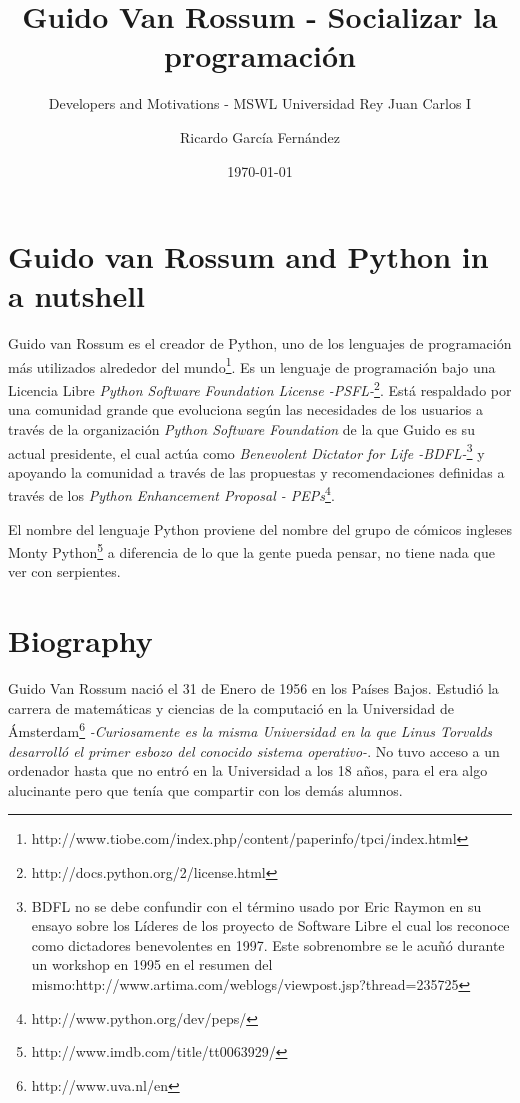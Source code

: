 \documentclass[11pt]{scrartcl}
\title{\textbf{Guido Van Rossum - Socializar la programación}}
\subtitle{Developers and Motivations - MSWL Universidad Rey Juan Carlos I}
\author{Ricardo García Fernández}
\date{\today}
\begin{document}
\maketitle

\newpage

\tableofcontents

\newpage

\section{Guido van Rossum and Python in a nutshell}

Guido van Rossum es el creador de Python, uno de los lenguajes de programación más utilizados alrededor del mundo\footnote{http://www.tiobe.com/index.php/content/paperinfo/tpci/index.html}. Es un lenguaje de programación bajo una Licencia Libre \emph{Python Software Foundation License -PSFL-}\footnote{http://docs.python.org/2/license.html}. Está respaldado por una comunidad grande que evoluciona según las necesidades de los usuarios a través de la organización \emph{Python Software Foundation} de la que Guido es su actual presidente, el cual actúa como \emph{Benevolent Dictator for Life -BDFL-}\footnote{BDFL no se debe confundir con el término usado por Eric Raymon en su ensayo sobre los Líderes de los proyecto de Software Libre el cual los reconoce como dictadores benevolentes en 1997. Este sobrenombre se le acuñó durante un workshop en 1995 en el resumen del mismo:http://www.artima.com/weblogs/viewpost.jsp?thread=235725} y apoyando la comunidad a través de las propuestas y recomendaciones definidas a través de los \emph{Python Enhancement Proposal - PEPs}\footnote{http://www.python.org/dev/peps/}.

El nombre del lenguaje Python proviene del nombre del grupo de cómicos ingleses Monty Python\footnote{http://www.imdb.com/title/tt0063929/} a diferencia de lo que la gente pueda pensar, no tiene nada que ver con serpientes.

\section{Biography}

Guido Van Rossum nació el 31 de Enero de 1956 en los Países Bajos. Estudió la carrera de matemáticas y ciencias de la computació en la Universidad de Ámsterdam\footnote{http://www.uva.nl/en} \emph{-Curiosamente es la misma Universidad en la que Linus Torvalds desarrolló el primer esbozo del conocido sistema operativo-}.
No tuvo acceso a un ordenador hasta que no entró en la Universidad a los 18 años, para el era algo alucinante pero que tenía que compartir con los demás alumnos.
\end{document}
